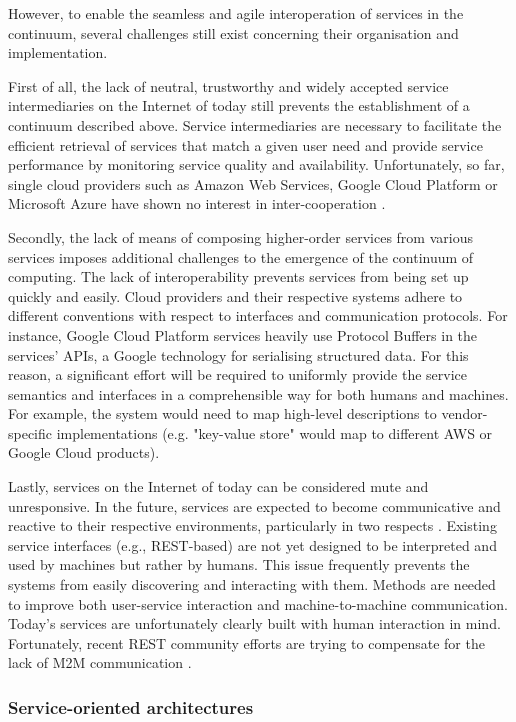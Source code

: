 However, to enable the seamless and agile interoperation of services in the continuum, several challenges still exist concerning their organisation and implementation.

First of all, the lack of neutral, trustworthy and widely accepted service intermediaries on the Internet of today still prevents the establishment of a continuum described above. Service intermediaries are necessary to facilitate the efficient retrieval of services that match a given user need and provide service performance by monitoring service quality and availability. Unfortunately, so far, single cloud providers such as Amazon Web Services, Google Cloud Platform or Microsoft Azure have shown no interest in inter-cooperation \cite{grozev2014inter}.

Secondly, the lack of means of composing higher-order services from various services imposes additional challenges to the emergence of the continuum of computing. The lack of interoperability prevents services from being set up quickly and easily. Cloud providers and their respective systems adhere to different conventions with respect to interfaces and communication protocols. For instance, Google Cloud Platform services heavily use Protocol Buffers \cite{protobuf} in the services' APIs, a Google technology for serialising structured data. For this reason, a significant effort will be required to uniformly provide the service semantics and interfaces in a comprehensible way for both humans and machines. For example, the system would need to map high-level descriptions to vendor-specific implementations (e.g. "key-value store" would map to different AWS or Google Cloud products).

Lastly, services on the Internet of today can be considered mute and unresponsive. In the future, services are expected to become communicative and reactive to their respective environments, particularly in two respects \cite{haller2008internet}. Existing service interfaces (e.g., REST-based) are not yet designed to be interpreted and used by machines but rather by humans. This issue frequently prevents the systems from easily discovering and interacting with them. Methods are needed to improve both user-service interaction and machine-to-machine communication. Today's services are unfortunately clearly built with human interaction in mind.  Fortunately, recent REST community efforts are trying to compensate for the lack of M2M communication \cite{openapi}.

\subsubsection{Service-oriented architectures}

